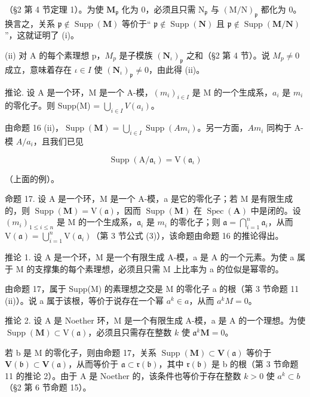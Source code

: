 （§2 第 4 节定理 1）。为使 \(\mathbf{M}_{\mathfrak{p}}\) 化为 0，必须且只需 \(\mathrm{N}_{\mathfrak{p}}\) 与 \((\mathrm{M} / \mathrm{N})_{\mathfrak{p}}\) 都化为 0。换言之，关系 \(\mathfrak{p} \notin \operatorname{Supp}(\mathbf{M})\) 等价于`` \(\mathfrak{p} \notin \operatorname{Supp}(\mathbf{N})\) 且 \(\mathfrak{p} \notin \operatorname{Supp}(\mathbf{M} / \mathbf{N})\) ''，这就证明了 (i)。

(ii) 对 A 的每个素理想 p，\(M_{p}\) 是子模族 \((\mathbf{N}_{\iota})_{\mathfrak{p}}\) 之和（§2 第 4 节）。说 \(M_{p} \neq 0\) 成立，意味着存在 \(\iota \in I\) 使 \((\mathbf{N}_{\iota})_{\mathfrak{p}} \neq 0\)，由此得 (ii)。

推论. 设 A 是一个环，M 是一个 A-模，\((m_{i})_{i\in I}\) 是 M 的一个生成系，\(a_{i}\) 是 \(m_{i}\) 的零化子。则 Supp(M) = \(\bigcup_{i\in I} V(a_{i})\)。

由命题 16 (ii)，\(\operatorname{Supp}(\mathbf{M}) = \bigcup_{i \in I} \operatorname{Supp}(Am_i)\)。另一方面，\(Am_i\) 同构于 A-模 \(A/a_i\)，且我们已见

\[
\operatorname{Supp} (\mathrm{A} / \mathfrak {a} _ {\iota}) = \mathrm{V} (\mathfrak {a} _ {\iota})
\]

（上面的例）。

命题 17. 设 A 是一个环，M 是一个 A-模，a 是它的零化子；若 M 是有限生成的，则 \(\operatorname{Supp}(\mathbf{M}) = \mathrm{V}(\mathfrak{a})\)，因而 \(\operatorname{Supp}(\mathbf{M})\) 在 \(\operatorname{Spec}(\mathbf{A})\) 中是闭的。设 \((m_i)_{1 \leqslant i \leqslant n}\) 是 M 的一个生成系，\(\mathfrak{a}_i\) 是 \(m_i\) 的零化子；则 \(\mathfrak{a} = \bigcap_{i=1}^{n} \mathfrak{a}_i\)，从而 \(\mathrm{V}(\mathfrak{a}) = \bigcup_{i=1}^{n} \mathrm{V}(\mathfrak{a}_i)\)（第 3 节公式 (3)），该命题由命题 16 的推论得出。

推论 1. 设 A 是一个环，M 是一个有限生成 A-模，a 是 A 的一个元素。为使 a 属于 M 的支撑集的每个素理想，必须且只需 M 上比率为 a 的位似是幂零的。

由命题 17，属于 Supp(M) 的素理想之交是 M 的零化子 a 的根（第 3 节命题 11 (ii)）。说 a 属于该根，等价于说存在一个幂 \(a^{k} \in a\)，从而 \(a^{k}M = 0\)。

推论 2. 设 A 是 Noether 环，M 是一个有限生成 A-模，a 是 A 的一个理想。为使 \(\operatorname{Supp}(\mathbf{M}) \subset \mathrm{V}(\mathfrak{a})\)，必须且只需存在整数 \(k\) 使 \(\mathfrak{a}^k\mathbf{M} = 0\)。

若 b 是 M 的零化子，则由命题 17，关系 \(\operatorname{Supp}(\mathbf{M}) \subset \mathbf{V}(\mathfrak{a})\) 等价于 \(\mathbf{V}(\mathfrak{b}) \subset \mathbf{V}(\mathfrak{a})\)，从而等价于 \(\mathfrak{a} \subset \mathfrak{r}(\mathfrak{b})\)，其中 \(\mathfrak{r}(\mathfrak{b})\) 是 b 的根（第 3 节命题 11 的推论 2）。由于 A 是 Noether 的，该条件也等价于存在整数 \(k > 0\) 使 \(a^{k} \subset b\)（§2 第 6 节命题 15）。

